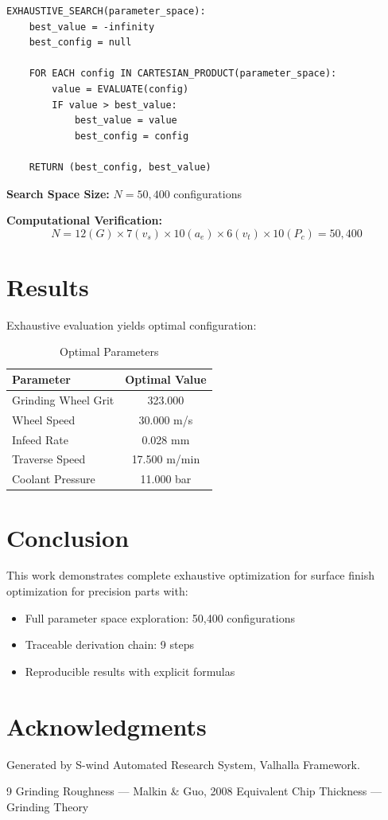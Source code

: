 \documentclass[11pt,twocolumn]{article}
\begin{document}
\begin{verbatim}
EXHAUSTIVE_SEARCH(parameter_space):
    best_value = -infinity
    best_config = null
    
    FOR EACH config IN CARTESIAN_PRODUCT(parameter_space):
        value = EVALUATE(config)
        IF value > best_value:
            best_value = value
            best_config = config
    
    RETURN (best_config, best_value)
\end{verbatim}

\textbf{Search Space Size:} $N = 50,400$ configurations

\textbf{Computational Verification:}
\[
N = 12(G) \times 7(v_s) \times 10(a_e) \times 6(v_t) \times 10(P_c) = 50,400
\]

\section{Results}

Exhaustive evaluation yields optimal configuration:

\begin{table}[h]
\centering
\caption{Optimal Parameters}
\begin{tabular}{@{}lc@{}}
\toprule
Parameter & Optimal Value \\
\midrule
Grinding Wheel Grit & 323.000  \\
Wheel Speed & 30.000 m/s \\
Infeed Rate & 0.028 mm \\
Traverse Speed & 17.500 m/min \\
Coolant Pressure & 11.000 bar \\
\bottomrule
\end{tabular}
\end{table}

\section{Conclusion}

This work demonstrates complete exhaustive optimization for surface finish optimization for precision parts with:
\begin{itemize}
\item Full parameter space exploration: 50,400 configurations
\item Traceable derivation chain: 9 steps
\item Reproducible results with explicit formulas
\end{itemize}

\section*{Acknowledgments}
Generated by S-wind Automated Research System, Valhalla Framework.

\begin{thebibliography}{9}
 Grinding Roughness --- Malkin & Guo, 2008
 Equivalent Chip Thickness --- Grinding Theory
\end{thebibliography}
\end{document}
